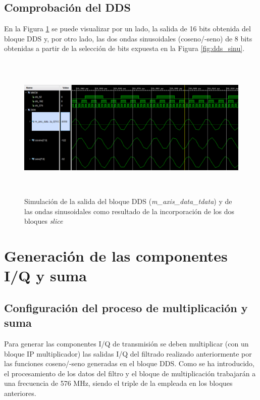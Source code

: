 \subsection{Comprobación del DDS}

En la Figura \ref{fig:dds2} se puede visualizar por un lado, la salida de 16 bits obtenida del bloque DDS y, por otro lado, las dos ondas sinusoidales (coseno/-seno) de 8 bits obtenidas a partir de la selección de bits expuesta en la Figura \ref{fig:dds_sinu}.

\vspace{3mm}

\begin{figure}[!h]
    \centering
    \includegraphics[width=1\textwidth,height=7cm]{img/simu/dds.PNG}
    \caption{Simulación de la salida del bloque DDS (\textit{m\_axis\_data\_tdata}) y de las ondas sinusoidales como resultado de la incorporación de los dos bloques \textit{slice}}
    \label{fig:dds2}
\end{figure}

\vspace{2mm}

\section{Generación de las componentes I/Q y suma}

\subsection{Configuración del proceso de multiplicación y suma}

Para generar las componentes I/Q de transmisión se deben multiplicar (con un bloque IP multiplicador) las salidas I/Q del filtrado realizado anteriormente por las funciones coseno/-seno generadas en el bloque DDS. Como se ha introducido, el procesamiento de los datos del filtro y el bloque de multiplicación trabajarán a una frecuencia de 576 MHz, siendo el triple de la empleada en los bloques anteriores. 

